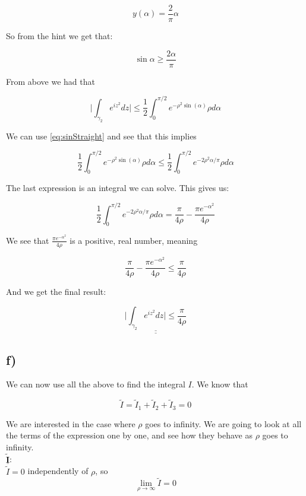 \documentclass[a4paper,norsk, 10pt]{article}
\begin{document}
$$
y(\alpha) = \frac{2}{\pi}\alpha
$$

So from the hint we get that:

\begin{equation}
\sin \alpha \geq \frac{2\alpha}{\pi}
\label{eq:sinStraight}
\end{equation}

From above we had that 

$$
\big| \int_{\gamma_2}e^{iz^2} dz \big| \leq \frac{1}{2}\int_0^{\pi/2} e^{-\rho^2 \sin(\alpha)}\rho d\alpha
$$

We can use \eqref{eq:sinStraight} and see that this implies 

$$
\frac{1}{2}\int_0^{\pi/2} e^{-\rho^2 \sin(\alpha)}\rho d\alpha \leq \frac{1}{2}\int_0^{\pi/2} e^{-2\rho^2 \alpha/\pi}\rho d\alpha
$$

The last expression is an integral we can solve. This gives us:

$$
\frac{1}{2}\int_0^{\pi/2} e^{-2\rho^2 \alpha/\pi}\rho d\alpha = \frac{\pi}{4\rho} - \frac{\pi e^{-\alpha^2}}{4\rho}
$$

We see that $\frac{\pi e^{-\alpha^2}}{4\rho}$ is a positive, real number, meaning 

$$
\frac{\pi}{4\rho} - \frac{\pi e^{-\alpha^2}}{4\rho} \leq  \frac{\pi}{4\rho}
$$

And we get the final result:

\begin{equation}
\underline{\underline{\big| \int_{\gamma_2}e^{iz^2} dz \big| \leq \frac{\pi}{4\rho}}}
\label{eq:I2}
\end{equation}



\subsection*{f)}

We can now use all the above to find the integral $I$. We know that

$$
\tilde{I} = \tilde{I}_1 + \tilde{I}_2 + \tilde{I}_3 = 0
$$

We are interested in the case where $\rho$ goes to infinity. We are going to look at all the terms of the expression one by one, and see how they behave as $\rho$ goes to infinity.\\

$\underline{\mathbf{\tilde{I}}}$:\\

$\tilde{I} = 0$ independently of $\rho$, so
\begin{equation}
\lim_{\rho \rightarrow \infty} \tilde{I} = 0
\label{eq:IrhoInf}
\end{equation}\\
\end{document}

